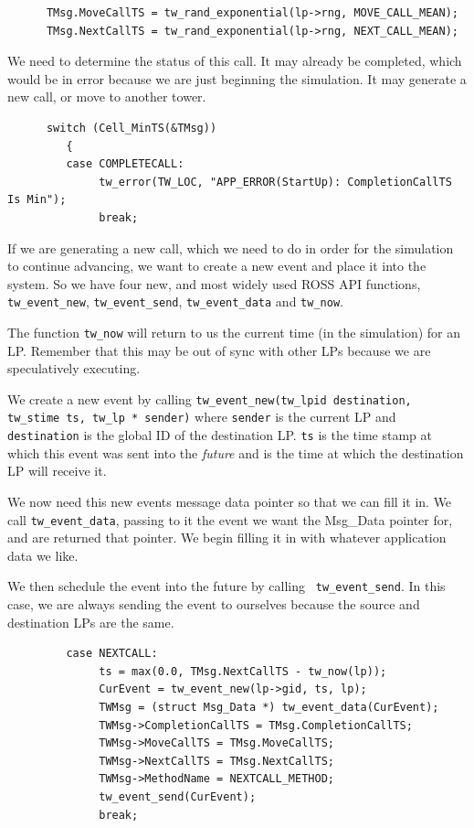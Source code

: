 \documentclass[12pt]{article}
\begin{document}
\begin{verbatim}
      TMsg.MoveCallTS = tw_rand_exponential(lp->rng, MOVE_CALL_MEAN);
      TMsg.NextCallTS = tw_rand_exponential(lp->rng, NEXT_CALL_MEAN);
\end{verbatim}
 
We need to determine the status of this call.  It may already be completed,
which would be in error because we are just beginning the simulation.  It may
generate a new call, or move to another tower.

\begin{verbatim}
      switch (Cell_MinTS(&TMsg))
         {
         case COMPLETECALL:
              tw_error(TW_LOC, "APP_ERROR(StartUp): CompletionCallTS Is Min");
              break;
\end{verbatim}
 
If we are generating a new call, which we need to do in order for the
simulation to continue advancing, we want to create a new event and
place it into the system.  So we have four new, and most widely used
ROSS API functions, {\tt tw\_event\_new}, {\tt tw\_event\_send}, {\tt tw\_event\_data} and
{\tt tw\_now}.  

The function {\tt tw\_now} will return to us the current time (in the
simulation) for an LP.  Remember that this may be out of sync with other LPs
because we are speculatively executing.

We create a new event by calling {\tt tw\_event\_new(tw\_lpid destination,
  tw\_stime ts, tw\_lp * sender)} where {\tt sender} is the current LP and
{\tt destination} is the global ID of the destination LP.  {\tt ts} is the
time stamp at which this event was sent into the {\em future} and is the time
at which the destination LP will receive it.

We now need this new events message data pointer so that we can fill
it in.  We call {\tt tw\_event\_data}, passing to it the event we want the
Msg\_Data pointer for, and are returned that pointer.  We begin filling
it in with whatever application data we like.

We then schedule the event into the future by calling {\tt
tw\_event\_send}.  In this case, we are always sending the event to
ourselves because the source and destination LPs are the same.

\begin{verbatim}
         case NEXTCALL:
              ts = max(0.0, TMsg.NextCallTS - tw_now(lp));
              CurEvent = tw_event_new(lp->gid, ts, lp);
              TWMsg = (struct Msg_Data *) tw_event_data(CurEvent);
              TWMsg->CompletionCallTS = TMsg.CompletionCallTS;
              TWMsg->MoveCallTS = TMsg.MoveCallTS;
              TWMsg->NextCallTS = TMsg.NextCallTS;
              TWMsg->MethodName = NEXTCALL_METHOD;
              tw_event_send(CurEvent);
              break;
\end{verbatim}
\end{document}
